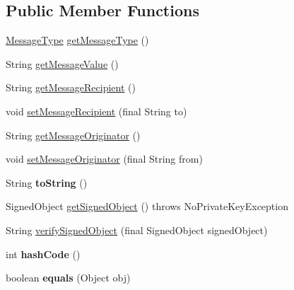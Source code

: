 \subsection*{Public Member Functions}
\begin{DoxyCompactItemize}
\item 
\hyperlink{enumgov_1_1fnal_1_1ppd_1_1ZZattic_1_1MessageType}{Message\-Type} \hyperlink{classgov_1_1fnal_1_1ppd_1_1ZZattic_1_1MessageCarrier_a2815136c8454ff691761c23dac942d23}{get\-Message\-Type} ()
\item 
String \hyperlink{classgov_1_1fnal_1_1ppd_1_1ZZattic_1_1MessageCarrier_af81213bb578f70befcd2392ddf083628}{get\-Message\-Value} ()
\item 
String \hyperlink{classgov_1_1fnal_1_1ppd_1_1ZZattic_1_1MessageCarrier_a3b36f242dd877bcd0d7addff3328566a}{get\-Message\-Recipient} ()
\item 
void \hyperlink{classgov_1_1fnal_1_1ppd_1_1ZZattic_1_1MessageCarrier_a63f5a9d0dda64711b4abab44fc459e28}{set\-Message\-Recipient} (final String to)
\item 
String \hyperlink{classgov_1_1fnal_1_1ppd_1_1ZZattic_1_1MessageCarrier_a9041fb2440cfeb821c3143ddc641892e}{get\-Message\-Originator} ()
\item 
void \hyperlink{classgov_1_1fnal_1_1ppd_1_1ZZattic_1_1MessageCarrier_aabc6ee957150d1935f78294d443d3205}{set\-Message\-Originator} (final String from)
\item 
\hypertarget{classgov_1_1fnal_1_1ppd_1_1ZZattic_1_1MessageCarrier_af2efc53e04503aa52cf35c76733da79f}{String {\bfseries to\-String} ()}\label{classgov_1_1fnal_1_1ppd_1_1ZZattic_1_1MessageCarrier_af2efc53e04503aa52cf35c76733da79f}

\item 
Signed\-Object \hyperlink{classgov_1_1fnal_1_1ppd_1_1ZZattic_1_1MessageCarrier_a75bcc6f6e84614494d9121e858f2b48e}{get\-Signed\-Object} ()  throws No\-Private\-Key\-Exception 
\item 
String \hyperlink{classgov_1_1fnal_1_1ppd_1_1ZZattic_1_1MessageCarrier_afdb0e1272d9c3f27065bddc9d520087e}{verify\-Signed\-Object} (final Signed\-Object signed\-Object)
\item 
\hypertarget{classgov_1_1fnal_1_1ppd_1_1ZZattic_1_1MessageCarrier_a9184009b9338ac902a60a6bde4774bd1}{int {\bfseries hash\-Code} ()}\label{classgov_1_1fnal_1_1ppd_1_1ZZattic_1_1MessageCarrier_a9184009b9338ac902a60a6bde4774bd1}

\item 
\hypertarget{classgov_1_1fnal_1_1ppd_1_1ZZattic_1_1MessageCarrier_a7cd6ea7fb22a369f3a2af0090f70dfad}{boolean {\bfseries equals} (Object obj)}\label{classgov_1_1fnal_1_1ppd_1_1ZZattic_1_1MessageCarrier_a7cd6ea7fb22a369f3a2af0090f70dfad}

\end{DoxyCompactItemize}
